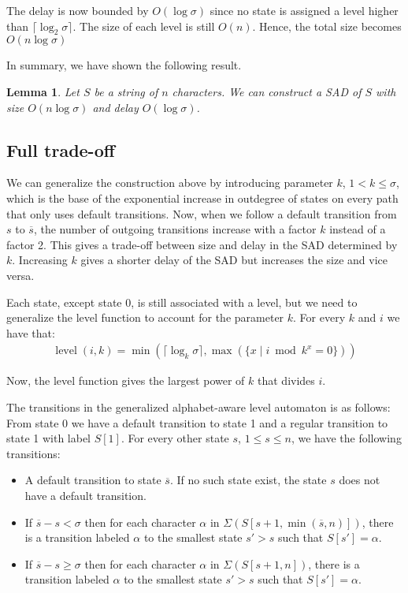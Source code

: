 \documentclass[a4paper,11pt]{article}
\newtheorem{lemma}{Lemma}
\DeclareMathOperator{\level}{level}
\begin{document}
The delay is now bounded by $O(\log \sigma)$ since no state is assigned a level higher than $\lceil \log_2 \sigma \rceil$.
The size of each level is still $O(n)$. Hence, the total size becomes $O(n\log \sigma)$

In summary, we have shown the following result.
\begin{lemma}\label{lemma:alphalevel}
  Let $S$ be a string of $n$ characters. We can construct a SAD of $S$ with size $O(n\log \sigma)$ and delay $O(\log \sigma)$.
\end{lemma}




\subsection{Full trade-off}
We can generalize the construction above by introducing parameter $k$, $1<k\leq\sigma$, which is the base of the exponential increase in outdegree of states on every path that only uses default transitions. Now, when we follow a default transition from $s$ to $\overline{s}$, the number of outgoing transitions increase with a factor $k$ instead of a factor 2.
This gives a trade-off between size and delay in the SAD determined by $k$. Increasing $k$ gives a shorter delay of the SAD but increases the size and vice versa.

Each state, except state 0, is still associated with a level, but we need to generalize the level function to account for the parameter $k$.
For every $k$ and $i$ we have that:
\begin{gather*}
\level(i, k)= \min(\lceil \log_k \sigma \rceil, \max(\{x \;|\; i \bmod k^x = 0 \}))
\end{gather*}

Now, the level function gives the largest power of $k$ that divides $i$. 










The transitions in the generalized alphabet-aware level automaton is as follows:
From state 0 we have a default transition to state 1 and a regular transition to state 1 with label $S[1]$.
For every other state $s$, $1 \leq s \leq n$, we have the following transitions:
\begin{itemize}
\item A default transition to state $\overline{s}$. If no such state exist, the state $s$ does not have a default transition.
\item If $\overline{s} - s < \sigma$ then for each character $\alpha$ in $\Sigma(S[s + 1, \min(\overline{s}, n)])$, there is a transition labeled $\alpha$ to the smallest state $s' > s$ such that $S[s']= \alpha$.
\item If $\overline{s} - s \geq \sigma$ then for each character $\alpha$ in $\Sigma(S[s + 1,  n])$, there is a transition labeled $\alpha$ to the smallest state $s' > s$ such that $S[s']= \alpha$.
\end{itemize}
\end{document}
